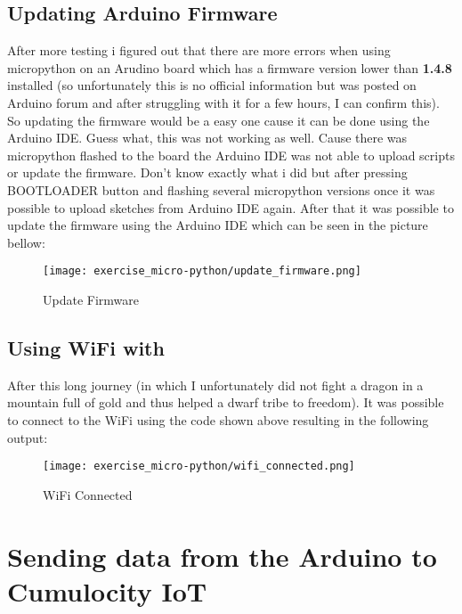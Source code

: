\subsection{Updating Arduino Firmware}

After more testing i figured out that there are more errors when using micropython on an Arudino board 
which has a firmware version lower than \textbf{1.4.8} installed (so unfortunately this is no official information 
but was posted on Arduino forum and after struggling with it for a few hours, I can confirm this).
\newline
\newline
So updating the firmware would be a easy one cause it can be done using the Arduino IDE.
Guess what, this was not working as well. Cause there was micropython flashed to the board the Arduino IDE 
was not able to upload scripts or update the firmware. Don't know exactly what i did but after 
pressing BOOTLOADER button and flashing several micropython versions once it was possible to upload 
sketches from Arduino IDE again. After that it was possible to update the firmware using the Arduino IDE 
which can be seen in the picture bellow:
\begin{figure}[H]
  \centering
  \texttt{[image: exercise\_micro-python/update\_firmware.png]}
  \caption{Update Firmware}
\end{figure}

\subsection{Using WiFi with }

After this long journey (in which I unfortunately did not fight a dragon in a mountain full of gold 
and thus helped a dwarf tribe to freedom). It was possible to connect to the WiFi using the code 
shown above resulting in the following output:

\begin{figure}[H]
  \centering
  \texttt{[image: exercise\_micro-python/wifi\_connected.png]}
  \caption{WiFi Connected}
\end{figure}

\section{Sending data from the Arduino to Cumulocity IoT}

